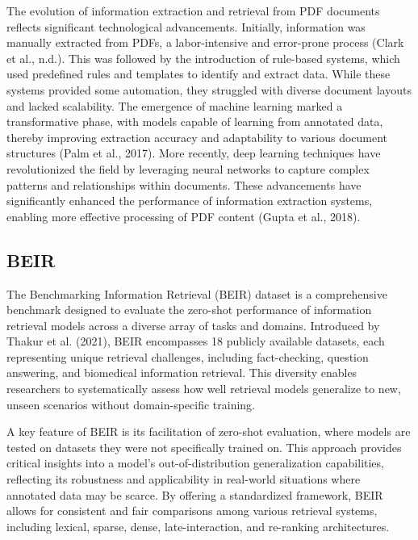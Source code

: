 The evolution of information extraction and retrieval from PDF documents reflects significant technological advancements. Initially, information was manually extracted from PDFs, a labor-intensive and error-prone process (Clark et al., n.d.). This was followed by the introduction of rule-based systems, which used predefined rules and templates to identify and extract data. While these systems provided some automation, they struggled with diverse document layouts and lacked scalability. The emergence of machine learning marked a transformative phase, with models capable of learning from annotated data, thereby improving extraction accuracy and adaptability to various document structures (Palm et al., 2017). More recently, deep learning techniques have revolutionized the field by leveraging neural networks to capture complex patterns and relationships within documents. These advancements have significantly enhanced the performance of information extraction systems, enabling more effective processing of PDF content (Gupta et al., 2018).



\subsection{BEIR}

\noindent The Benchmarking Information Retrieval (BEIR) dataset is a comprehensive benchmark designed to evaluate the zero-shot performance of information retrieval models across a diverse array of tasks and domains. Introduced by Thakur et al. (2021), BEIR encompasses 18 publicly available datasets, each representing unique retrieval challenges, including fact-checking, question answering, and biomedical information retrieval. This diversity enables researchers to systematically assess how well retrieval models generalize to new, unseen scenarios without domain-specific training.

A key feature of BEIR is its facilitation of zero-shot evaluation, where models are tested on datasets they were not specifically trained on. This approach provides critical insights into a model's out-of-distribution generalization capabilities, reflecting its robustness and applicability in real-world situations where annotated data may be scarce. By offering a standardized framework, BEIR allows for consistent and fair comparisons among various retrieval systems, including lexical, sparse, dense, late-interaction, and re-ranking architectures.

